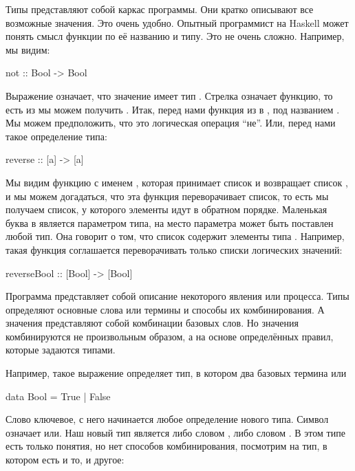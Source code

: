 Типы представляют собой каркас программы. Они кратко описывают все
возможные значения. Это очень удобно. Опытный программист на Haskell
может понять смысл функции по её названию и типу. Это не очень сложно.
Например, мы видим:


\begin{code}
not :: Bool -> Bool
\end{code}

Выражение  означает, что значение  имеет тип .
Стрелка  означает функцию, то есть из  мы можем
получить . Итак, перед нами функция из  в , под
названием . Мы можем предположить, что это логическая операция
``не''. Или, перед нами такое определение типа:


\begin{code}
reverse :: [a] -> [a]
\end{code}

Мы видим функцию с именем , которая принимает список
\In{[a]} и возвращает список \In{[a]}, и мы можем догадаться, что эта
функция переворачивает список, то есть мы получаем список, у которого
элементы идут в обратном порядке. Маленькая буква  в \In{[a]}
является параметром типа, на место параметра может быть поставлен любой
тип. Она говорит о том, что список содержит элементы типа .
Например, такая функция соглашается переворачивать только списки
логических значений:


\begin{code}
reverseBool :: [Bool] -> [Bool]
\end{code}

Программа представляет собой описание некоторого явления или процесса.
Типы определяют основные слова или термины и способы их комбинирования.
А значения представляют собой комбинации базовых слов. Но значения
комбинируются не произвольным образом, а на основе определённых правил,
которые задаются типами.

Например, такое выражение определяет тип, в котором два базовых термина
 или 


\begin{code}
data Bool = True | False
\end{code}

Слово  ключевое, с него начинается любое определение нового
типа. Символ \In{|} означает или. Наш новый тип  является либо
словом , либо словом . В этом типе есть только
понятия, но нет способов комбинирования, посмотрим на тип, в котором
есть и то, и другое:


